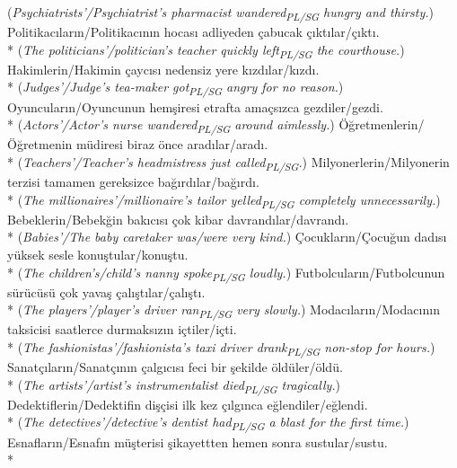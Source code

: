 ({\it Psychiatrists'/Psychiatrist's pharmacist wandered\textsubscript{PL/SG} hungry and thirsty.})
\ex Politikac{\i}lar{\i}n/Politikac{\i}n{\i}n hocas{\i} adliyeden \c{c}abucak \c{c}{\i}kt{\i}lar/\c{c}{\i}kt{\i}.\\*
({\it The politicians'/politician's teacher quickly left\textsubscript{PL/SG} the courthouse.})
\ex Hakimlerin/Hakimin \c{c}ayc{\i}s{\i} nedensiz yere k{\i}zd{\i}lar/k{\i}zd{\i}.\\*
({\it Judges'/Judge's tea-maker got\textsubscript{PL/SG} angry for no reason.})
\ex Oyuncular{\i}n/Oyuncunun hem\c{s}iresi etrafta ama\c{c}s{\i}zca gezdiler/gezdi.\\*
({\it Actors'/Actor's nurse wandered\textsubscript{PL/SG} around aimlessly.})
\ex \"{O}\u{g}retmenlerin/\"{O}\u{g}retmenin m\"{u}diresi biraz \"{o}nce arad{\i}lar/arad{\i}.\\*
({\it Teachers'/Teacher's headmistress just called\textsubscript{PL/SG}.})
\ex Milyonerlerin/Milyonerin terzisi tamamen gereksizce ba\u{g}{\i}rd{\i}lar/ba\u{g}{\i}rd{\i}.\\*
({\it The millionaires'/millionaire's tailor yelled\textsubscript{PL/SG} completely unnecessarily.})
\ex Bebeklerin/Bebek\u{g}in bak{\i}c{\i}s{\i} \c{c}ok kibar davrand{\i}lar/davrand{\i}.\\*
({\it Babies'/The baby caretaker was/were very kind.})
\ex \c{C}ocuklar{\i}n/\c{C}ocu\u{g}un dad{\i}s{\i} y\"{u}ksek sesle konu\c{s}tular/konu\c{s}tu.\\*
({\it The children's/child's nanny spoke\textsubscript{PL/SG} loudly.})
\ex Futbolcular{\i}n/Futbolcunun s\"{u}r\"{u}c\"{u}s\"{u} \c{c}ok yava\c{s} \c{c}al{\i}\c{s}t{\i}lar/\c{c}al{\i}\c{s}t{\i}.\\*
({\it The players'/player's driver ran\textsubscript{PL/SG} very slowly.})
\ex Modac{\i}lar{\i}n/Modac{\i}n{\i}n taksicisi saatlerce durmaks{\i}z{\i}n i\c{c}tiler/i\c{c}ti.\\*
({\it The fashionistas'/fashionista's taxi driver drank\textsubscript{PL/SG} non-stop for hours.})
\ex Sanat\c{c}{\i}lar{\i}n/Sanat\c{c}{\i}n{\i}n \c{c}alg{\i}c{\i}s{\i} feci bir \c{s}ekilde \"{o}ld\"{u}ler/\"{o}ld\"{u}.\\*
({\it The artists'/artist's instrumentalist died\textsubscript{PL/SG} tragically.})
\ex Dedektiflerin/Dedektifin di\c{s}\c{c}isi ilk kez \c{c}{\i}lg{\i}nca e\u{g}lendiler/e\u{g}lendi.\\*
({\it The detectives'/detective's dentist had\textsubscript{PL/SG} a blast for the first time.})
\ex Esnaflar{\i}n/Esnaf{\i}n m\"{u}\c{s}terisi \c{s}ikayettten hemen sonra sustular/sustu.\\*
